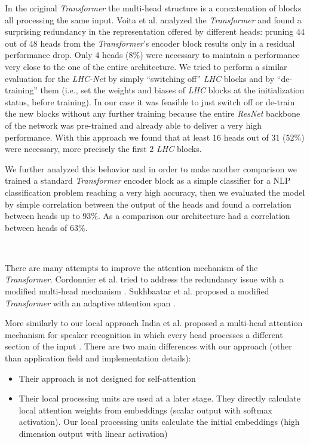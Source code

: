 \documentclass[fleqn,10pt]{SelfArx}
\begin{document}
In the original \textit{Transformer} the multi-head structure is a concatenation of blocks all processing the same input. Voita et al. \cite{voita2019analyzing} analyzed the \textit{Transformer} and found a surprising redundancy in the representation offered by different heads: pruning $44$ out of $48$ heads from the \textit{Transformer}'s encoder block results only in a residual performance drop. Only $4$ heads ($8\%$) were necessary to maintain a performance very close to the one of the entire architecture. We tried to perform a similar evaluation for the \textit{LHC-Net} by simply ``switching off'' \textit{LHC} blocks and by ``de-training'' them (i.e., set the weights and biases of \textit{LHC} blocks at the initialization status, before training). In our case it was feasible to just switch off or de-train the new blocks without any further training because the entire \textit{ResNet} backbone of the network was pre-trained and already able to deliver a very high performance. With this approach we found that at least $16$ heads out of $31$ ($52\%$) were necessary, more precisely the first $2$ \textit{LHC} blocks.

We further analyzed this behavior and in order to make another comparison we trained a standard \textit{Transformer} encoder block as a simple classifier for a NLP classification problem reaching a very high accuracy, then we evaluated the model by simple correlation between the output of the heads and found a correlation between heads up to $93\%$. As a comparison our architecture had a correlation between heads of $63\%$.

\

There are many attempts to improve the attention mechanism of the \textit{Transformer}. Cordonnier et al. tried to address the redundancy issue with a modified multi-head mechanism \cite{cordonnier2020multi}. Sukhbaatar et al. proposed a modified \textit{Transformer} with an adaptive attention span \cite{sukhbaatar2019adaptive}.

More similarly to our local approach India et al. proposed a multi-head attention mechanism for speaker recognition in which every head processes a different section of the input \cite{india2019self}. There are two main differences with our approach (other than application field and implementation details): 
\begin{itemize}
 \item Their approach is not designed for self-attention
 \item Their local processing units are used at a later stage. They directly calculate local attention weights from embeddings (scalar output with softmax activation). Our local processing units calculate the initial embeddings (high dimension output with linear activation)
\end{itemize}
\end{document}
